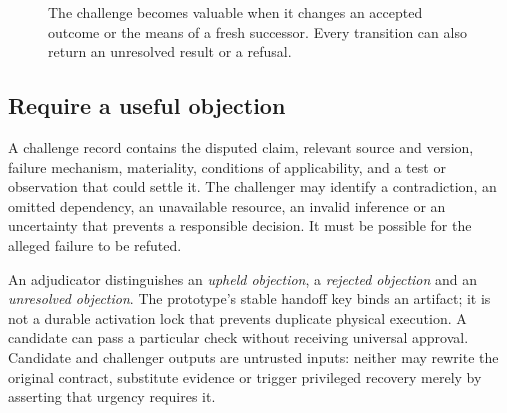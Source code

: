 \documentclass[11pt,a4paper]{article}
\begin{document}
\begin{figure}[h!]
\centering
{}
\caption{The challenge becomes valuable when it changes an accepted outcome or the means of a fresh successor. Every transition can also return an unresolved result or a refusal.}
\end{figure}

\subsection{Require a useful objection}
A challenge record contains the disputed claim, relevant source and version, failure mechanism, materiality, conditions of applicability, and a test or observation that could settle it. The challenger may identify a contradiction, an omitted dependency, an unavailable resource, an invalid inference or an uncertainty that prevents a responsible decision. It must be possible for the alleged failure to be refuted.

An adjudicator distinguishes an \emph{upheld objection}, a \emph{rejected objection} and an \emph{unresolved objection}. The prototype's stable handoff key binds an artifact; it is not a durable activation lock that prevents duplicate physical execution. A candidate can pass a particular check without receiving universal approval. Candidate and challenger outputs are untrusted inputs: neither may rewrite the original contract, substitute evidence or trigger privileged recovery merely by asserting that urgency requires it.
\end{document}
